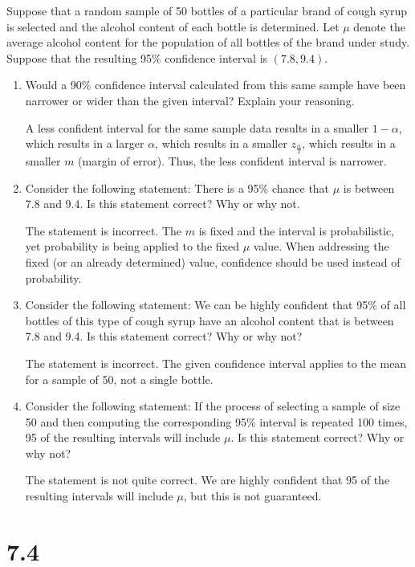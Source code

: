 \documentclass[letterpaper,12pt,fleqn]{article}
\renewcommand{\a}{\alpha}
\newcommand{\m}{\mu}
\newcommand{\zadt}{z_{\frac{\a}{2}}}
\begin{document}
Suppose that a random sample of 50 bottles of a particular brand of cough syrup is selected and the alcohol content of each
bottle is determined.  Let \(\m\) denote the average alcohol content for the population of all bottles of the brand under
study.  Suppose that the resulting 95\% confidence interval is \((7.8,9.4)\).
\begin{enumerate}[label={\alph*)}]
\item Would a 90\% confidence interval calculated from this same sample have been narrower or wider than the given
  interval?  Explain your reasoning.

  A less confident interval for the same sample data results in a smaller \(1-\a\), which results in a larger \(\a\), which
  results in a smaller \(\zadt\), which results in a smaller \(m\) (margin of error).  Thus, the less confident interval is
  narrower.

\item Consider the following statement: There is a 95\% chance that \(\m\) is between 7.8 and 9.4.  Is this statement
  correct?  Why or why not.

  The statement is incorrect.  The \(m\) is fixed and the interval is probabilistic, yet probability is being applied to the
  fixed \(\m\) value.  When addressing the fixed (or an already determined) value, confidence should be used instead of
  probability.

\item Consider the following statement: We can be highly confident that 95\% of all bottles of this type of cough syrup
  have an alcohol content that is between 7.8 and 9.4.  Is this statement correct?  Why or why not?

  The statement is incorrect.  The given confidence interval applies to the mean for a sample of 50, not a single bottle.

\item Consider the following statement: If the process of selecting a sample of size 50 and then computing the corresponding
  95\% interval is repeated 100 times, 95 of the resulting intervals will include \(\m\).  Is this statement correct?  Why or
  why not?

  The statement is not quite correct.  We are highly confident that 95 of the resulting intervals will include \(\m\), but
  this is not guaranteed.
\end{enumerate}

\section*{7.4}
\end{document}
